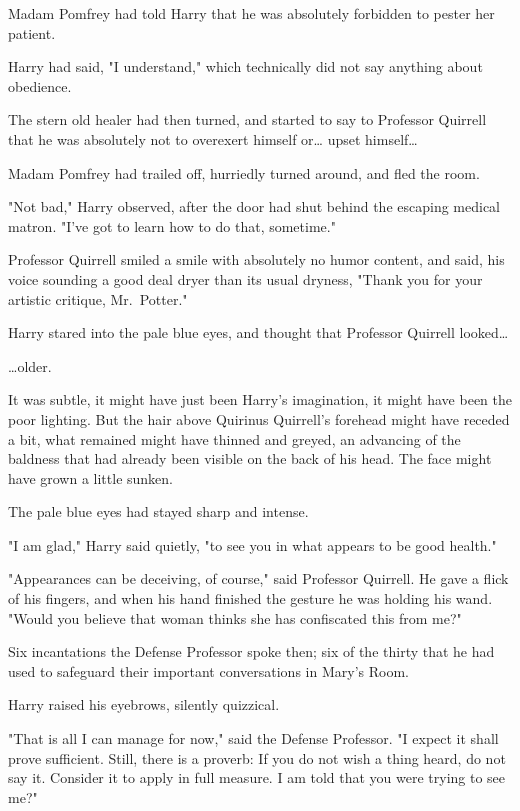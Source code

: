 Madam Pomfrey had told Harry that he was absolutely forbidden to pester her
patient.

Harry had said, "I understand," which technically did not say anything about
obedience.

The stern old healer had then turned, and started to say to Professor Quirrell
that he was absolutely not to overexert himself or{\ldots} upset himself{\ldots}

Madam Pomfrey had trailed off, hurriedly turned around, and fled the room.

"Not bad," Harry observed, after the door had shut behind the escaping medical
matron. "I've got to learn how to do that, sometime."

Professor Quirrell smiled a smile with absolutely no humor content, and said,
his voice sounding a good deal dryer than its usual dryness, "Thank you for
your artistic critique, Mr.~Potter."

Harry stared into the pale blue eyes, and thought that Professor Quirrell
looked{\ldots}

{\ldots}older.

It was subtle, it might have just been Harry's imagination, it might have been
the poor lighting. But the hair above Quirinus Quirrell's forehead might have
receded a bit, what remained might have thinned and greyed, an advancing of the
baldness that had already been visible on the back of his head. The face might
have grown a little sunken.

The pale blue eyes had stayed sharp and intense.

"I am glad," Harry said quietly, "to see you in what appears to be good health."

"Appearances can be deceiving, of course," said Professor Quirrell. He gave a
flick of his fingers, and when his hand finished the gesture he was holding his
wand. "Would you believe that woman thinks she has confiscated this from me?"

Six incantations the Defense Professor spoke then; six of the thirty that he
had used to safeguard their important conversations in Mary's Room.

Harry raised his eyebrows, silently quizzical.

"That is all I can manage for now," said the Defense Professor. "I expect it
shall prove sufficient. Still, there is a proverb: If you do not wish a thing
heard, do not say it. Consider it to apply in full measure. I am told that you
were trying to see me?"

